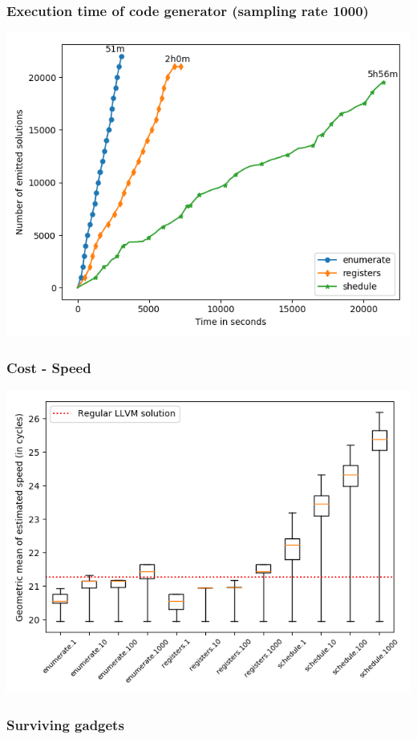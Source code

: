\begin{frame}
	\frametitle{Execution time of code generator (sampling rate 1000)}

	\includegraphics[width=\textwidth]{../results/figures/generator_time}

\end{frame}

\begin{frame}
	\frametitle{Cost - Speed}

	\includegraphics[width=\textwidth]{../results/figures/cost_speed}

\end{frame}

\begin{frame}
	\frametitle{Surviving gadgets}


\end{frame}

